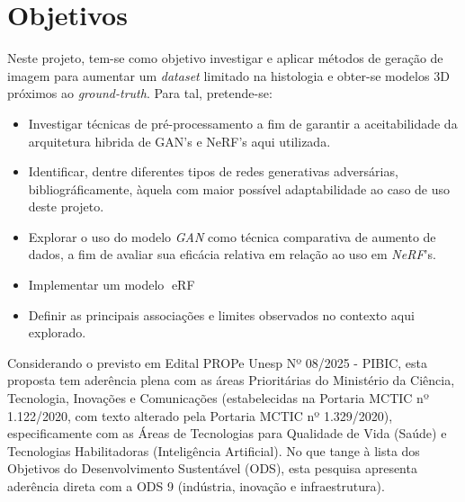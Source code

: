 \section{Objetivos}


Neste projeto, tem-se como objetivo investigar e aplicar métodos de geração de imagem para aumentar um \textit{dataset} limitado na histologia e obter-se modelos 3D próximos ao \textit{ground-truth}. Para tal, pretende-se:

\begin{itemize}
  \item Investigar técnicas de pré-processamento a fim de garantir a aceitabilidade da arquitetura hibrida de GAN's e NeRF's aqui utilizada. 
  \item Identificar, dentre diferentes tipos de redes generativas adversárias, bibliográficamente, àquela com maior possível adaptabilidade ao caso de uso deste projeto. 
  \item Explorar o uso do modelo \textit{GAN} como técnica comparativa de aumento de dados, a fim de avaliar sua eficácia relativa em relação ao uso em \textit{NeRF}'s.
  \item Implementar um modelo eRF
  \item Definir as principais associações e limites observados no contexto aqui explorado.
\end{itemize}

%
%    
%
Considerando o previsto em Edital PROPe Unesp Nº 08/2025 - PIBIC, esta proposta tem aderência plena com as áreas Prioritárias do Ministério da Ciência, Tecnologia, Inovações e Comunicações (estabelecidas na Portaria MCTIC nº 1.122/2020, com texto alterado pela Portaria MCTIC nº 1.329/2020), especificamente com as Áreas de Tecnologias para Qualidade de Vida (Saúde) e Tecnologias Habilitadoras (Inteligência Artificial). No que tange à lista dos Objetivos do Desenvolvimento Sustentável (ODS), esta pesquisa apresenta aderência direta com a ODS 9 (indústria, inovação e infraestrutura).
